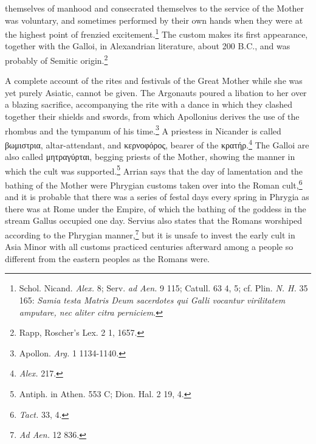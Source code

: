 \documentclass[a4paper, 11pt, oneside, polutonikogreek, english]{article}
\begin{document}
themselves of manhood and consecrated themselves to the service of the Mother was voluntary, and sometimes performed by their own hands when they were at the highest point of frenzied excitement.\footnote{Schol. Nicand. \emph{Alex.} 8; Serv. \emph{ad Aen.} 9 115; Catull. 63 4, 5; cf. Plin. \emph{N. H.} 35 165: \emph{Samia testa Matris Deum sacerdotes qui Galli vocantur virilitatem amputare, nec aliter citra perniciem}.} The custom makes its first appearance, together with the Galloi, in Alexandrian literature, about 200 \textsc{B.C.}, and was probably of Semitic origin.\footnote{Rapp, Roscher's Lex. 2 1, 1657.}

A complete account of the rites and festivals of the Great Mother while she was yet purely Asiatic, cannot be given. The Argonauts poured a libation to her over a blazing sacrifice, accompanying the rite with a dance in which they clashed together their shields and swords, from which Apollonius derives the use of the rhombus and the tympanum of his time.\footnote{Apollon. \emph{Arg.} 1 1134-1140.} A priestess in Nicander is called βωμιστρια, altar-attendant, and κερνοφόρος, bearer of the κρατήρ.\footnote{\emph{Alex.} 217.} The Galloi are also called μητραγύρται, begging priests of the Mother, showing the manner in which the cult was supported.\footnote{Antiph. in Athen. 553 C; Dion. Hal. 2 19, 4.} Arrian says that the day of lamentation and the bathing of the Mother were Phrygian customs taken over into the Roman cult,\footnote{\emph{Tact.} 33, 4.} and it is probable that there was a series of festal days every spring in Phrygia as there was at Rome under the Empire, of which the bathing of the goddess in the stream Gallus occupied one day. Servius also states that the Romans worshiped according to the Phrygian manner,\footnote{\emph{Ad Aen.} 12 836.} but it is unsafe to invest the early cult in Asia Minor with all customs practiced centuries afterward among a people so different from the eastern peoples as the Romans were.
\end{document}
